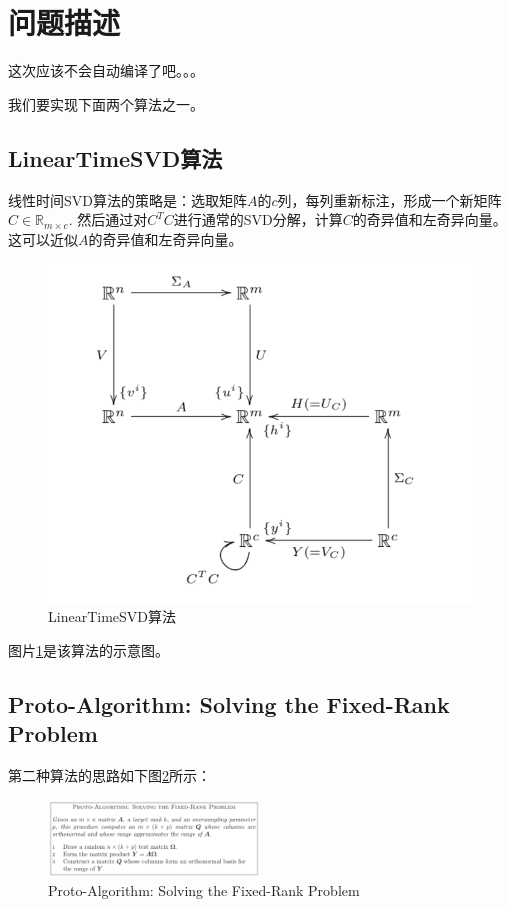 \documentclass[12pt,letterpaper]{article}
\begin{document}
\section*{问题描述}

这次应该不会自动编译了吧。。。

我们要实现下面两个算法之一。

\subsection*{LinearTimeSVD算法}

线性时间SVD算法的策略是：选取矩阵$A$的$c$列，每列重新标注，形成一个新矩阵$C\in\mathbb{R}_{m\times c}.$ 然后通过对$C^TC$进行通常的SVD分解，计算$C$的奇异值和左奇异向量。这可以近似$A$的奇异值和左奇异向量。

\begin{figure}[h]
    \centering
    \includegraphics{ltsvd.png}
    \caption{LinearTimeSVD算法}
    \label{ltsvd}
\end{figure}

图片\ref{ltsvd}是该算法的示意图。

\subsection*{Proto-Algorithm: Solving the Fixed-Rank Problem}

第二种算法的思路如下图\ref{pasfrp}所示：

\begin{figure}[h]
    \centering
    \includegraphics[width = 0.5\textwidth]{randomizedprototype.png}
    \caption{Proto-Algorithm: Solving the Fixed-Rank Problem}
    \label{pasfrp}
\end{figure}
\end{document}
